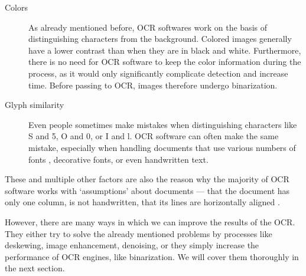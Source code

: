 \begin{description}
\item[Colors] As already mentioned before, OCR softwares work on the basis of distinguishing characters from the background.  Colored images generally have a lower contrast than when they are in black and white. Furthermore, there is no need for OCR software to keep the color information during the process, as it would only significantly complicate detection and increase time. Before passing to OCR, images therefore undergo binarization. 
\item[Glyph similarity] Even people sometimes make mistakes when distinguishing characters like S and 5, O and 0, or I and l. OCR software can often make the same mistake, especially when handling documents that use various numbers of fonts , decorative fonts, or even  handwritten text.
\end{description}

These and multiple other factors are also the reason why the majority of OCR software works with `assumptions' about documents ---  that the document has only one column, is not handwritten, that its lines are horizontally aligned . 

However, there are many ways in which we can improve the results of the OCR. They either try to solve the already mentioned problems by processes like deskewing, image enhancement, denoising, or they simply increase the performance of OCR engines, like binarization. We will cover them thoroughly in the next section.

